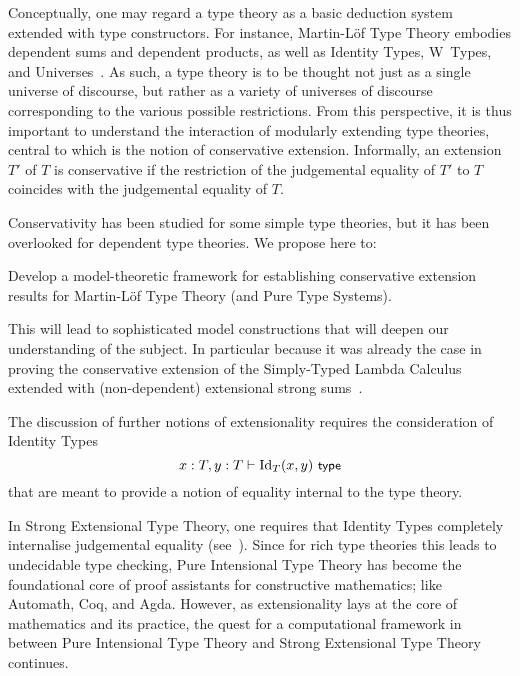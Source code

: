 \documentclass[11pt,twocolumn]{article}
\newcounter{CC}
\newenvironment{resenumerate}
  {\begin{list}{[\textbf{\arabic{CC}]}}
  {\usecounter{CC}
   \setlength{\topsep}{2pt}
   \setlength{\partopsep}{2pt}
   \setlength{\itemsep}{2.5pt}
   \setlength{\parsep}{2.5pt}
   \setlength{\leftmargin}{1.65em}
   \setlength{\labelwidth}{1.15em}
 }}
  {\end{list}}
\newcommand{\hide}[1]{}
\newcommand{\eg}{\emph{eg.}}
\newcommand{\vs}{\emph{vs.}}
\newcommand{\Id}{\mathrm{Id}}
\begin{document}
\hide{CwFs \vs~substitution algebras}

Conceptually, one may regard a type theory as a basic deduction system
extended with type constructors.  For instance, Martin-L\"of Type Theory
embodies dependent sums and dependent products, as well as Identity Types,
W~Types, and Universes~\cite{ProgMLTT}.  As such, a type theory is to be
thought not just as a single universe of discourse, but rather as a
variety of universes of discourse corresponding to the various possible
restrictions.  From this perspective, it is thus important to understand the
interaction of modularly extending type theories, central to which is the
notion of conservative extension.  Informally, an extension $T'$ of $T$ is
conservative if the restriction of the judgemental equality of $T'$ to $T$
coincides with the judgemental equality of $T$.

Conservativity has been studied for some simple type 
theories, %
but it has been overlooked for dependent type theories.  We propose here to:
\begin{resenumerate}\setcounter{CC}{3}
\item
  Develop a model-theoretic framework for establishing conservative
  extension results for Martin-L\"of Type Theory (and Pure Type Systems).
\end{resenumerate}
This will lead to sophisticated model constructions that will deepen our
understanding of the subject.  In particular because it was already the case
in proving the conservative extension of the Simply-Typed Lambda Calculus
extended with (non-dependent) extensional strong sums~\cite{FioreRemarks}.

The discussion of further notions of extensionality requires the consideration
of Identity Types
  \[
  x:T,y:T\vdash\Id_T(x,y)\ \mbox{\small$\mathsf{type}$}
\]
that are meant to provide a notion of equality internal to the type theory.

In Strong Extensional Type Theory, one requires that Identity Types completely
internalise judgemental equality (see~\cite{MartinLofETT}).  Since for rich
type theories this leads to undecidable type checking, Pure Intensional Type
Theory has become the foundational core of proof assistants for constructive
mathematics; like
Automath, %
Coq, %
and 
Agda. %
However, as extensionality lays at the core of mathematics and its practice,
the quest for a computational framework in between Pure Intensional Type
Theory and Strong Extensional Type Theory continues.
\end{document}
